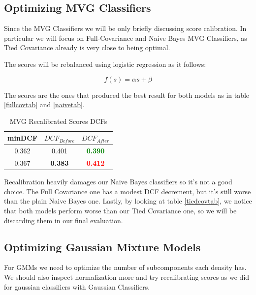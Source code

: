 \documentclass[12pt, twocolumn]{article}
\begin{document}
\subsection{Optimizing MVG Classifiers}

Since the MVG Classifiers we will be only briefly discussing score calibration.
In particular we will focus on Full-Covariance and Naive Bayes MVG Classifiers, as Tied Covariance already is very close to being optimal.

The scores will be rebalanced using logistic regression as it follows:


\begin{equation}
    f(s) = \alpha s + \beta
\end{equation}

The scores are the ones that produced the best result for both models as in table \ref{fullcovtab} and \ref{naivetab}. 

\begin{table}[H]
    \centering
        \begin{tabular}{||c|c|c||}
            \hline
            minDCF & $DCF_{Before}$ & $DCF_{After}$ \\
            \hline
            \hline
            0.362 & 0.401 & \textcolor{green}{\bf0.390} \\ 
            0.367 & {\bf 0.383} & \textcolor{red}{\bf 0.412} \\ 
            \hline
    \end{tabular}
    \caption{MVG Recalibrated Scores DCFs}
    \label{mvgcalibration}
\end{table}

Recalibration heavily damages our Naive Bayes classifiers so it's not a good choice.
The Full Covariance one has a modest DCF decrement, but it's still worse than the plain Naive Bayes one.
Lastly, by looking at table \ref{tiedcovtab}, we notice that both models perform worse than our Tied Covariance one, so we will be discarding them in our final evaluation.

\subsection{Optimizing Gaussian Mixture Models}

For GMMs we need to optimize the number of subcomponents each density has.
We should also inspect normalization more and try recalibrating scores as we did for gaussian classifiers with Gaussian Classifiers.
\end{document}
